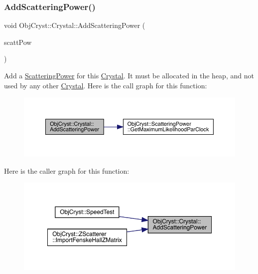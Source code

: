 \subsubsection{\texorpdfstring{AddScatteringPower()}{AddScatteringPower()}}
{\footnotesize\ttfamily void Obj\+Cryst\+::\+Crystal\+::\+Add\+Scattering\+Power (\begin{DoxyParamCaption}\item[{\mbox{\hyperlink{class_obj_cryst_1_1_scattering_power}{Scattering\+Power}} $\ast$}]{scatt\+Pow }\end{DoxyParamCaption})}

Add a \mbox{\hyperlink{class_obj_cryst_1_1_scattering_power}{Scattering\+Power}} for this \mbox{\hyperlink{class_obj_cryst_1_1_crystal}{Crystal}}. It must be allocated in the heap, and not used by any other \mbox{\hyperlink{class_obj_cryst_1_1_crystal}{Crystal}}. Here is the call graph for this function\+:
\nopagebreak
\begin{figure}[H]
\begin{center}
\leavevmode
\includegraphics[width=350pt]{class_obj_cryst_1_1_crystal_a76d2d19234fbc5733f5c565a4bf9a1c7_cgraph}
\end{center}
\end{figure}
Here is the caller graph for this function\+:
\nopagebreak
\begin{figure}[H]
\begin{center}
\leavevmode
\includegraphics[width=350pt]{class_obj_cryst_1_1_crystal_a76d2d19234fbc5733f5c565a4bf9a1c7_icgraph}
\end{center}
\end{figure}
\mbox{\label{class_obj_cryst_1_1_crystal_a12969ab06ecb5293c57fb305e146cc72}} 
